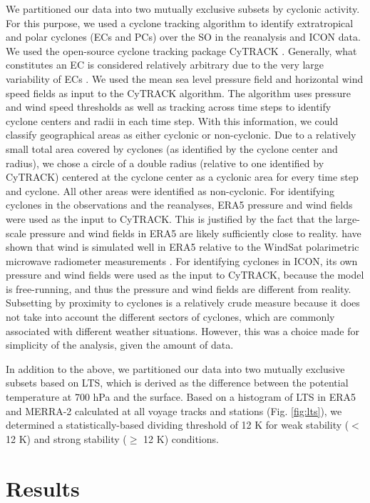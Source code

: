\documentclass[draft]{agujournal2019}
\begin{document}
We partitioned our data into two mutually exclusive subsets by cyclonic activity. For this purpose, we used a cyclone tracking algorithm to identify extratropical and polar cyclones (ECs and PCs) over the SO in the reanalysis and ICON data. We used the open-source cyclone tracking package CyTRACK . Generally, what constitutes an EC is considered relatively arbitrary due to the very large variability of ECs . We used the mean sea level pressure field and horizontal wind speed fields as input to the CyTRACK algorithm. The algorithm uses pressure and wind speed thresholds as well as tracking across time steps to identify cyclone centers and radii in each time step. With this information, we could classify geographical areas as either cyclonic or non-cyclonic. Due to a relatively small total area covered by cyclones (as identified by the cyclone center and radius), we chose a circle of a double radius (relative to one identified by CyTRACK) centered at the cyclone center as a cyclonic area for every time step and cyclone. All other areas were identified as non-cyclonic. For identifying cyclones in the observations and the reanalyses, ERA5 pressure and wind fields were used as the input to CyTRACK. This is justified by the fact that the large-scale pressure and wind fields in ERA5 are likely sufficiently close to reality.  have shown that wind is simulated well in ERA5 relative to the WindSat polarimetric microwave radiometer measurements \cite{meissner2009}. For identifying cyclones in ICON, its own pressure and wind fields were used as the input to CyTRACK, because the model is free-running, and thus the pressure and wind fields are different from reality. Subsetting by proximity to cyclones is a relatively crude measure because it does not take into account the different sectors of cyclones, which are commonly associated with different weather situations. However, this was a choice made for simplicity of the analysis, given the amount of data.

In addition to the above, we partitioned our data into two mutually exclusive subsets based on LTS, which is derived as the difference between the potential temperature at 700 hPa and the surface. Based on a histogram of LTS in ERA5 and MERRA-2 calculated at all voyage tracks and stations (Fig. \ref{fig:lts}), we determined a statistically-based dividing threshold of 12 K for weak stability ($<$ 12 K) and strong stability ($\geq$ 12 K) conditions.

\section{Results}
\label{sec:results}
\end{document}
